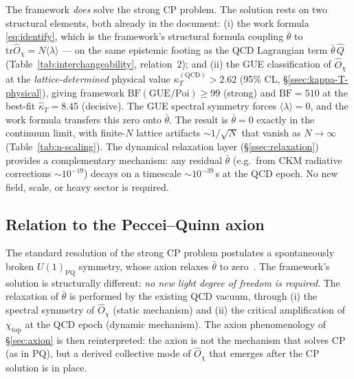 \documentclass[11pt,a4paper]{article}
\newcommand{\Opchi}{\hat{O}_\chi}
\providecommand{\tr}{}
\renewcommand{\tr}{\mathrm{tr}}
\theoremstyle{plain}
\theoremstyle{definition}
\theoremstyle{remark}
\begin{document}
\begin{verdict}
The framework \emph{does} solve the strong CP problem.  The solution
rests on two structural elements, both already in the document: (i)
the work formula \eqref{eq:identify}, which is the framework's
structural formula coupling $\bar\theta$ to $\tr\Opchi =
N\langle\lambda\rangle$ --- on the same epistemic footing as the QCD
Lagrangian term $\bar\theta\,\hat Q$ (Table~\ref{tab:interchangeability},
relation~2); and (ii) the GUE classification of $\Opchi$ at the
\emph{lattice-determined} physical value
$\kappa_T^{(\mathrm{QCD})} > 2.62$ (95\% CL,
\S\ref{ssec:kappa-T-physical}), giving framework
$\mathrm{BF}(\mathrm{GUE}/\mathrm{Poi}) \ge 99$ (strong) and
$\mathrm{BF} = 510$ at the best-fit $\hat\kappa_T = 8.45$ (decisive).
The GUE spectral symmetry forces $\langle\lambda\rangle = 0$, and the
work formula transfers this zero onto $\bar\theta$.  The result is
$\bar\theta = 0$ exactly in the continuum limit, with finite-$N$
lattice artifacts $\sim 1/\sqrt{N}$ that vanish as $N\to\infty$
(Table~\ref{tab:n-scaling}).  The dynamical relaxation layer
(\S\ref{ssec:relaxation}) provides a complementary mechanism: any
residual $\bar\theta$ (e.g.\ from CKM radiative corrections
$\sim 10^{-19}$) decays on a timescale $\sim 10^{-39}\,$s at the QCD
epoch.  No new field, scale, or heavy sector is required.
\end{verdict}

\subsection{Relation to the Peccei--Quinn axion}

The standard resolution of the strong CP problem postulates a
spontaneously broken $U(1)_{\mathrm{PQ}}$ symmetry, whose axion
relaxes $\bar\theta$ to zero~\cite{pecceiquinn1977,weinberg1978,
wilczek1978}.  The framework's solution is structurally different:
\emph{no new light degree of freedom is required}.  The
relaxation of $\bar\theta$ is performed by the existing QCD vacuum,
through (i) the spectral symmetry of $\Opchi$ (static mechanism) and
(ii) the critical amplification of $\chi_{\mathrm{top}}$ at the QCD
epoch (dynamic mechanism).  The axion phenomenology of
\S\ref{sec:axion} is then reinterpreted: the axion is not the
mechanism that solves CP (as in PQ), but a derived collective mode
of $\Opchi$ that emerges after the CP solution is in place.

\end{document}
